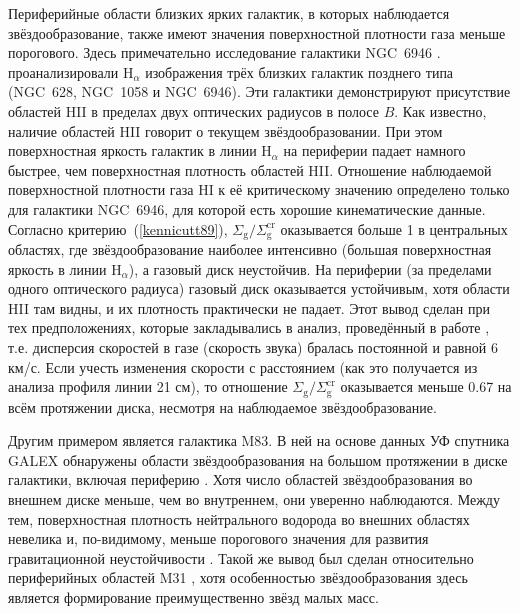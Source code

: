 \documentclass[russian,12pt]{article}
\begin{document}
Периферийные области близких ярких галактик, в которых наблюдается 
звёздообразование, также имеют значения поверхностной плотности газа 
меньше порогового. Здесь примечательно исследование галактики NGC~6946 
\citep{Ferguson+98}. \cite{Ferguson+98} проанализировали 
$\mathrm{H}_{\alpha}$ изображения трёх близких галактик позднего типа 
(NGC~628, NGC~1058 и NGC~6946). Эти галактики демонстрируют присутствие 
областей HII в пределах двух оптических радиусов в полосе $B$. Как известно, 
наличие областей HII говорит о текущем звёздообразовании. 
При этом поверхностная яркость галактик в линии $\mathrm{H}_{\alpha}$ на 
периферии падает намного быстрее, чем поверхностная плотность областей 
HII. Отношение наблюдаемой поверхностной плотности газа HI к её критическому 
значению определено только для галактики NGC~6946, для которой есть 
хорошие кинематические данные. Согласно критерию~(\ref{kennicutt89}), 
$\Sigma_\mathrm{g} / \Sigma_\mathrm{g}^\mathrm{cr}$ оказывается больше 1 
в центральных областях, где звёздообразование наиболее интенсивно 
(большая поверхностная яркость в линии $\mathrm{H}_{\alpha}$), 
а газовый диск неустойчив. На периферии (за пределами одного 
оптического радиуса) газовый диск оказывается устойчивым, хотя области 
HII там видны, и их плотность практически не падает. Этот вывод сделан 
при тех предположениях, которые закладывались в анализ, проведённый в работе 
\cite{Kennicutt89}, т.е. дисперсия скоростей в газе (скорость звука) 
бралась постоянной и равной 6 км/с. Если учесть изменения скорости с 
расстоянием (как это получается из анализа профиля линии 21 см), то 
отношение $\Sigma_\mathrm{g} / \Sigma_\mathrm{g}^\mathrm{cr}$ 
оказывается меньше 0.67 на всём протяжении диска, несмотря на 
наблюдаемое звёздообразование.

Другим примером является галактика M83. В ней на основе данных УФ спутника 
GALEX обнаружены области 
звёздообразования на большом протяжении в диске галактики, включая 
периферию \citep{Thilker+05}. Хотя число областей звёздообразования во 
внешнем диске меньше, чем во внутреннем, они уверенно наблюдаются. 
Между тем, поверхностная плотность нейтрального водорода во внешних 
областях невелика и, по-видимому, меньше порогового значения для 
развития гравитационной неустойчивости \citep{Kennicutt89}. Такой же 
вывод был сделан относительно периферийных областей M31 
\citep{Cuillandre+01}, хотя особенностью звёздообразования здесь 
является формирование преимущественно звёзд малых масс.
\end{document}
